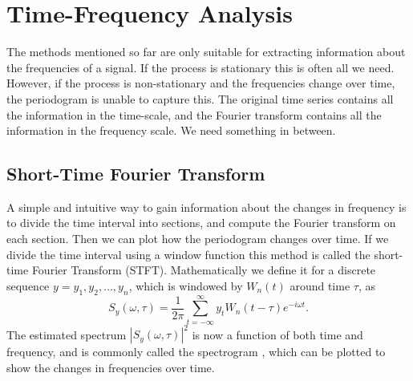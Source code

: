 \documentclass[a4paper]{memoir}
\theoremstyle{plain}
\theoremstyle{definition}
\theoremstyle{remark}
\begin{document}
\section{Time-Frequency Analysis}
The methods mentioned so far are only suitable for extracting information about the frequencies of a signal.
If the process is stationary this is often all we need.
However, if the process is non-stationary and the frequencies change over time, the periodogram is unable to capture this.
The original time series contains all the information in the time-scale, and the Fourier transform contains all the information in the frequency scale.
We need something in between.

\subsection{Short-Time Fourier Transform}
A simple and intuitive way to gain information about the changes in frequency is to divide the time interval into sections, and compute the Fourier transform on each section.
Then we can plot how the periodogram changes over time.
If we divide the time interval using a window function this method is called the short-time Fourier Transform (STFT).
Mathematically we define it for a discrete sequence $y = y_1, y_2, \hdots, y_n$, which is windowed by $W_n(t)$ around time $\tau$, as
\begin{equation}\label{eq:stft}
        S_y(\omega, \tau) = \frac{1}{2 \pi} \sum_{t = -\infty}^{\infty}y_t W_n(t - \tau)e^{-i\omega t}.
\end{equation}
The estimated spectrum $|S_y(\omega, \tau)|^2$ is now a function of both time and frequency, and is commonly called the spectrogram \cite{cohen}, which can be plotted to show the changes in frequencies over time.
\end{document}
